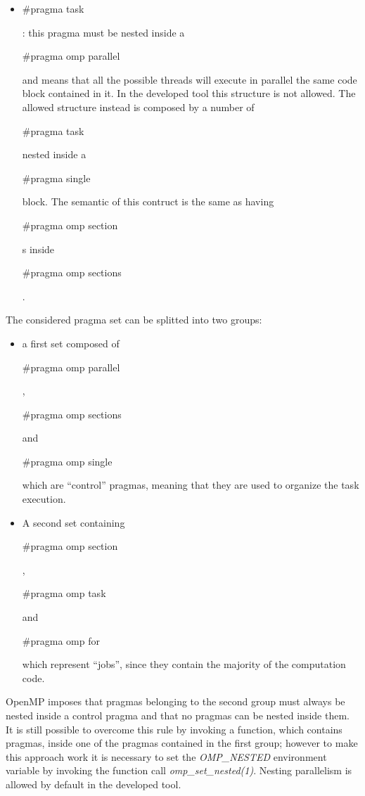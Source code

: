 \documentclass[a4paper,12pt,oneside]{book}
\begin{document}
\begin{itemize}
\item{\begin{bf}{$\#$pragma task}\end{bf} : this pragma must be nested inside a \begin{bf}{$\#$pragma omp parallel }\end{bf} and means that all the possible threads will execute in parallel the same code block contained in it. In the developed tool this structure is not allowed. The allowed structure instead is composed by a number of \begin{bf}{$\#$pragma task}\end{bf} nested inside a \begin{bf}{$\#$pragma single}\end{bf} block. The semantic of this contruct is the same as  having \begin{bf}{$\#$pragma omp section}\end{bf}s inside \begin{bf}{$\#$pragma omp sections}\end{bf}.}
\end{itemize}
The considered pragma set can be splitted into two groups: 
\begin{itemize}
\item{a first set composed of \begin{bf}{$\#$pragma omp parallel}\end{bf}, \begin{bf}{$\#$pragma omp sections}\end{bf} and \begin{bf}{ $\#$pragma omp single}\end{bf} which are “control” pragmas, meaning that they are used to organize the task execution.}
\item{A second set containing \begin{bf}{$\#$pragma omp section}\end{bf}, \begin{bf}{$\#$pragma omp task}\end{bf} and \begin{bf}{$\#$pragma omp for}\end{bf} which represent “jobs”, since they contain the majority of the computation code.}
\end{itemize}

OpenMP imposes that pragmas belonging to the second group must always be nested inside a control pragma and that no pragmas can be nested inside them. It is still possible to overcome this rule by invoking a function, which contains pragmas, inside one of the pragmas contained in the first group; however to make this approach work it is necessary to set the \emph{OMP\_NESTED} environment variable by invoking the function call \emph{omp\_set\_nested(1)}. Nesting parallelism is allowed by default in the developed tool. 
\end{document}
